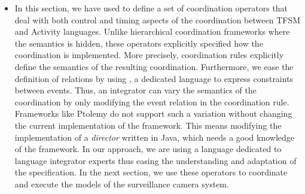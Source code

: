 \begin{itemize}
	 \item In this section, we have used \bcool to define a set of coordination operators that deal with both control and timing aspects of the coordination between TFSM and Activity languages. Unlike hierarchical coordination frameworks where the semantics is hidden, these operators explicitly specified how the coordination is implemented. More precisely, coordination rules explicitly define the semantics of the resulting coordination. Furthermore, we ease the definition of relations by using \moccml, a dedicated language to express constraints between events. Thus, an integrator can vary the semantics of the coordination by only modifying the event relation in the coordination rule. Frameworks like Ptolemy do not support such a variation without changing the current implementation of the framework. This means modifying the implementation of a \emph{director} written in Java, which needs a good knowledge of the framework. In our approach, we are using a language dedicated to language integrator experts thus easing the understanding and adaptation of the \bcool specification. In the next section, we use these operators to coordinate and execute the models of the surveillance camera system.
	 
\end{itemize}


  




















